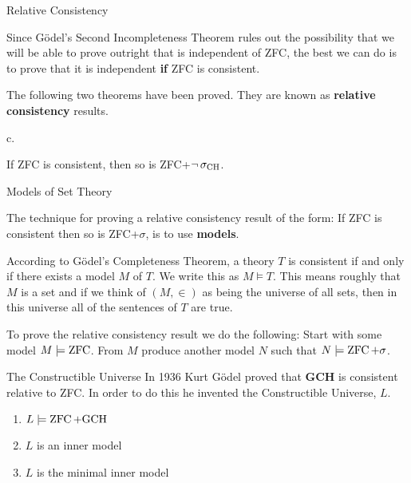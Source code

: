 \documentclass[pdf,final]{prosper}
\newcommand{\skipsmall}{\vspace{1em}}
\begin{document}
\begin{slide}{Relative Consistency}

Since G\"odel's Second Incompleteness Theorem rules out the possibility that we
will be able to prove outright that \CH is independent of ZFC, the best we
can do is to prove that it is independent \textbf{if} ZFC is consistent.

\skipsmall

The following two theorems have been proved. They are known as \textbf{relative
consistency} results.

\skipsmall

\begin{theorem}[G\"odel, 1936]
c.
\end{theorem}

\skipsmall

\begin{theorem}
If ZFC is consistent, then so is ZFC+$\neg\operatorname{\sigma_{\text{CH}}}$.
\end{theorem}

\end{slide}

\begin{slide}{Models of Set Theory}

The technique for proving a relative consistency result of the form: If ZFC is
consistent then so is ZFC+$\sigma$, is to use \textbf{models}.

\skipsmall

According to G\"odel's Completeness Theorem, a theory $T$ is consistent if and
only if there exists a model $M$ of $T$. We write this as $M\models T$. This
means
roughly that $M$ is a set and if we think of $(M,\in)$ as being the universe of
all sets, then in this universe all of the sentences of $T$ are true.

\skipsmall

To prove the relative consistency result we do the following: Start with some
model $M\models\operatorname{ZFC}$. From $M$ produce another model $N$ such that $N\models\operatorname{ZFC}+\sigma$.

\end{slide}

\begin{slide}{The Constructible Universe}
In 1936 Kurt G\"odel proved that \textbf{GCH} is consistent relative to ZFC. In order to
do this he invented the Constructible Universe, $L$.

\skipsmall

\begin{enumerate}
  \item $L\models\operatorname{ZFC}+\text{GCH}$
  \item $L$ is an inner model
  \item $L$ is the minimal inner model
\end{enumerate}

\end{slide}
\end{document}
